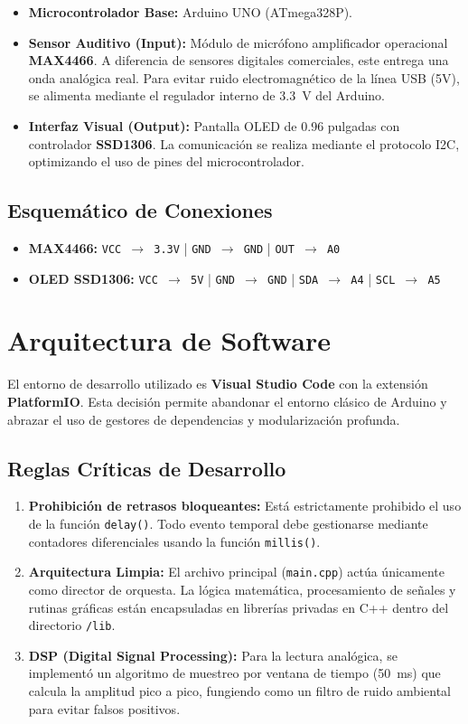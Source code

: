 \documentclass[10pt]{article}
\begin{document}
\begin{itemize}
    \item \textbf{Microcontrolador Base:} Arduino UNO (ATmega328P).
    \item \textbf{Sensor Auditivo (Input):} Módulo de micrófono amplificador operacional \textbf{MAX4466}. A diferencia de sensores digitales comerciales, este entrega una onda analógica real. Para evitar ruido electromagnético de la línea USB (5V), se alimenta mediante el regulador interno de \SI{3.3}{\volt} del Arduino.
    \item \textbf{Interfaz Visual (Output):} Pantalla OLED de 0.96 pulgadas con controlador \textbf{SSD1306}. La comunicación se realiza mediante el protocolo I2C, optimizando el uso de pines del microcontrolador.
\end{itemize}

\subsection{Esquemático de Conexiones}
\begin{itemize}
    \item \textbf{MAX4466:} \texttt{VCC $\rightarrow$ 3.3V} | \texttt{GND $\rightarrow$ GND} | \texttt{OUT $\rightarrow$ A0}
    \item \textbf{OLED SSD1306:} \texttt{VCC $\rightarrow$ 5V} | \texttt{GND $\rightarrow$ GND} | \texttt{SDA $\rightarrow$ A4} | \texttt{SCL $\rightarrow$ A5}
\end{itemize}

\section{Arquitectura de Software}
El entorno de desarrollo utilizado es \textbf{Visual Studio Code} con la extensión \textbf{PlatformIO}. Esta decisión permite abandonar el entorno clásico de Arduino y abrazar el uso de gestores de dependencias y modularización profunda.

\subsection{Reglas Críticas de Desarrollo}
\begin{enumerate}
    \item \textbf{Prohibición de retrasos bloqueantes:} Está estrictamente prohibido el uso de la función \texttt{delay()}. Todo evento temporal debe gestionarse mediante contadores diferenciales usando la función \texttt{millis()}.
    \item \textbf{Arquitectura Limpia:} El archivo principal (\texttt{main.cpp}) actúa únicamente como director de orquesta. La lógica matemática, procesamiento de señales y rutinas gráficas están encapsuladas en librerías privadas en C++ dentro del directorio \texttt{/lib}.
    \item \textbf{DSP (Digital Signal Processing):} Para la lectura analógica, se implementó un algoritmo de muestreo por ventana de tiempo (\SI{50}{\milli\second}) que calcula la amplitud pico a pico, fungiendo como un filtro de ruido ambiental para evitar falsos positivos.
\end{enumerate}
\end{document}
